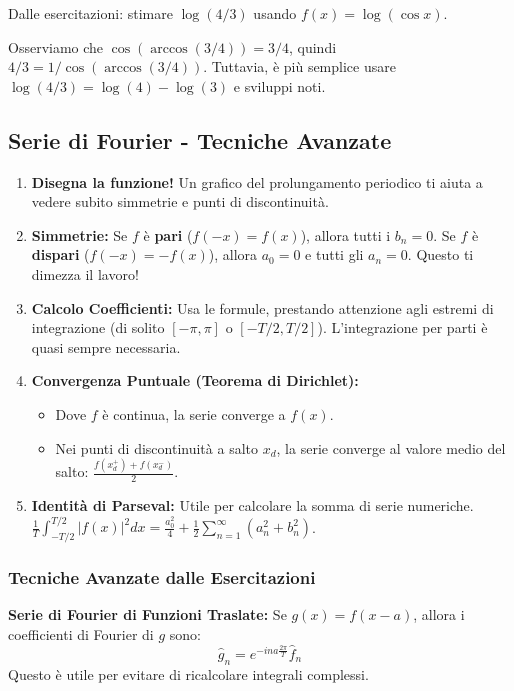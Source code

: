 \begin{esempio}
Dalle esercitazioni: stimare $\log(4/3)$ usando $f(x) = \log(\cos x)$.

Osserviamo che $\cos(\arccos(3/4)) = 3/4$, quindi $4/3 = 1/\cos(\arccos(3/4))$.
Tuttavia, è più semplice usare $\log(4/3) = \log(4) - \log(3)$ e sviluppi noti.
\end{esempio}

\subsection{Serie di Fourier - Tecniche Avanzate}
\begin{strategia}
\begin{enumerate}
    \item \textbf{Disegna la funzione!} Un grafico del prolungamento periodico ti aiuta a vedere subito simmetrie e punti di discontinuità. 
    \item \textbf{Simmetrie:} Se $f$ è \textbf{pari} ($f(-x)=f(x)$), allora tutti i $b_n=0$. Se $f$ è \textbf{dispari} ($f(-x)=-f(x)$), allora $a_0=0$ e tutti gli $a_n=0$. Questo ti dimezza il lavoro! 
    \item \textbf{Calcolo Coefficienti:} Usa le formule, prestando attenzione agli estremi di integrazione (di solito $[-\pi, \pi]$ o $[-T/2, T/2]$). L'integrazione per parti è quasi sempre necessaria. 
    \item \textbf{Convergenza Puntuale (Teorema di Dirichlet):}
        \begin{itemize}
            \item Dove $f$ è continua, la serie converge a $f(x)$. 
            \item Nei punti di discontinuità a salto $x_d$, la serie converge al valore medio del salto: $\frac{f(x_d^+) + f(x_d^-)}{2}$. 
        \end{itemize}
    \item \textbf{Identità di Parseval:} Utile per calcolare la somma di serie numeriche. $\frac{1}{T} \int_{-T/2}^{T/2} |f(x)|^2 dx = \frac{a_0^2}{4} + \frac{1}{2} \sum_{n=1}^\infty (a_n^2 + b_n^2)$. 
\end{enumerate}
\end{strategia}

\subsubsection{Tecniche Avanzate dalle Esercitazioni}

\begin{info}
\textbf{Serie di Fourier di Funzioni Traslate:}
Se $g(x) = f(x-a)$, allora i coefficienti di Fourier di $g$ sono:
\[ \hat{g}_n = e^{-ina\frac{2\pi}{T}} \hat{f}_n \]
Questo è utile per evitare di ricalcolare integrali complessi.
\end{info}

